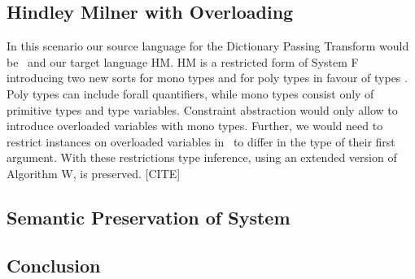 \subsection{Hindley Milner with Overloading}
In this scenario our source language for the Dictionary Passing Transform would be \HMo\ and our target language HM. HM is a restricted form of System F introducing two new sorts  for mono types and  for poly types in favour of types . Poly types can include forall quantifiers, while mono types consist only of primitive types and type variables. Constraint abstraction would only allow to introduce overloaded variables with mono types. Further, we would need to restrict instances on overloaded variables in \HMo\ to differ in the type of their first argument. With these restrictions type inference, using an extended version of Algorithm W, is preserved. [CITE]
\subsection{Semantic Preservation of System \Fo}

\subsection{Conclusion}